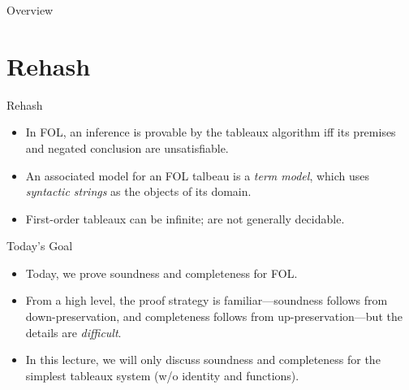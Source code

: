 \begin{frame}
  \setcounter{framenumber}{331}
  \maketitle
\end{frame}

\begin{frame}{Overview}
\tableofcontents
\end{frame}

\section{Rehash}
\begin{frame}{Rehash}
	
	\begin{itemize}%
	\itemsep=16pt
	
	\item In FOL, an inference is provable by the tableaux algorithm iff its premises and negated conclusion are unsatisfiable.
                  		
	\item An associated model for an FOL talbeau is a \emph{term model}, which uses \emph{syntactic strings} as the objects of its domain.
		
	\item First-order tableaux can be infinite; are not generally decidable.
		
					
	\end{itemize}

\end{frame}
		
\begin{frame}{Today's Goal}

	\begin{itemize}%
	\itemsep=16pt
		
        \item Today, we prove soundness and completeness for FOL.
        
        \item From a high level, the proof strategy is familiar---soundness follows from down-preservation, and completeness follows from up-preservation---but the details are \emph{difficult}.

	\item In this lecture, we will only discuss soundness and completeness for the simplest tableaux system (w/o identity and functions). 
          
	\end{itemize}

\end{frame}


